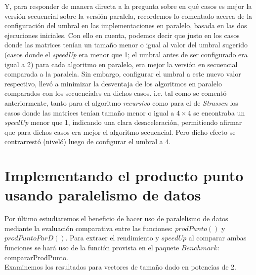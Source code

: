 \documentclass{article}
\begin{document}
Y, para responder de manera directa a la pregunta sobre en qué casos es mejor la versión secuencial sobre la versión paralela, recordemos lo comentado acerca de la configuración del umbral en las implementaciones en paralelo, basada en las dos ejecuciones iniciales. Con ello en cuenta, podemos decir que justo en los casos donde las matrices tenían un tamaño menor o igual al valor del umbral sugerido (casos donde el \textit{speedUp} era menor que 1; el umbral antes de ser configurado era igual a 2) para cada algoritmo en paralelo, era mejor la versión en secuencial comparada a la paralela. Sin embargo, configurar el umbral a este nuevo valor respectivo, llevó a minimizar la desventaja de los algoritmos en paralelo comparados con los secuenciales en dichos casos. i.e. tal como se comentó anteriormente, tanto para el algoritmo \textit{recursivo} como para el de \textit{Strassen} los casos donde las matrices tenían tamaño menor o igual a \(4 \times 4\) se encontraba un \textit{speedUp} menor que 1, indicando una clara desaceleración, permitiendo afirmar que para dichos casos era mejor el algoritmo secuencial. Pero dicho efecto se contrarrestó (niveló) luego de configurar el umbral a 4.

\clearpage

\section{Implementando el producto punto usando paralelismo de datos} 

Por último estudiaremos el beneficio de hacer uso de paralelismo de datos mediante la evaluación comparativa entre las funciones: \(prodPunto()\) y \(prodPuntoParD()\). Para extraer el rendimiento y \(speedUp\) al comparar ambas funciones se hará uso de la función provista en el paquete \(Benchmark\): compararProdPunto.\\

Examinemos los resultados para vectores de tamaño dado en potencias de 2.
\end{document}
